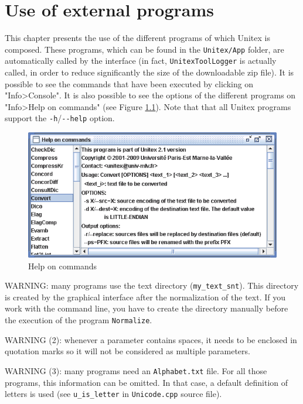 \chapter{Use of external programs}
\label{chap-external-programs}
This chapter presents the use of the different programs of which Unitex is
composed. These programs, which can be found in the \verb+Unitex/App+ folder, are
automatically called by the interface (in fact, \verb+UnitexToolLogger+ is
actually called, in order to reduce significantly the size of the downloadable
zip file). It is possible to see the commands that have been executed by
clicking on "Info>Console". It is also possible to see the options of the different programs on "Info>Help on commands" (see Figure \ref{fig-help}). Note that that all Unitex
programs support the \verb$-h$/\verb$--help$ option.

\bigskip
\begin{figure}[!h]
\begin{center}
\includegraphics[width=14cm]{resources/img/fig11-1.png}
\caption{Help on commands\label{fig-help}}
\end{center}
\end{figure}

\bigskip
\noindent WARNING: many programs use the text directory
(\verb+my_text_snt+). This directory is created by the graphical interface after
the normalization of the text. If you work with the command line, you have to
create the directory manually before the execution of the program
\verb+Normalize+.

\bigskip
\noindent WARNING (2): whenever a parameter contains spaces, it needs to
be enclosed in quotation marks so it will not be considered as multiple
parameters.

\bigskip
\noindent WARNING (3): many programs need an \verb+Alphabet.txt+ file. For all
those programs, this information can be omitted. In that case, a default
definition of letters is used (see \verb+u_is_letter+ 
in \verb$Unicode.cpp$ source file).


